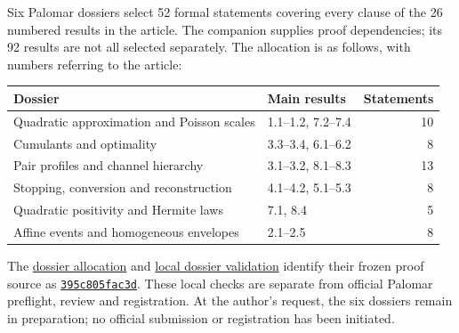 Six Palomar dossiers select 52 formal statements covering every clause
of the 26 numbered results in the article. The companion supplies proof
dependencies; its 92 results are not all selected separately.
The allocation is as follows, with numbers referring to the article:
\begin{center}
\small
\begin{tabularx}{\linewidth}{@{}Xlr@{}}
\toprule
Dossier & Main results & Statements\\
\midrule
Quadratic approximation and Poisson scales & 1.1--1.2, 7.2--7.4 & 10\\
Cumulants and optimality & 3.3--3.4, 6.1--6.2 & 8\\
Pair profiles and channel hierarchy & 3.1--3.2, 8.1--8.3 & 13\\
Stopping, conversion and reconstruction & 4.1--4.2, 5.1--5.3 & 8\\
Quadratic positivity and Hermite laws & 7.1, 8.4 & 5\\
Affine events and homogeneous envelopes & 2.1--2.5 & 8\\
\bottomrule
\end{tabularx}
\end{center}
The
\href{https://github.com/Vulkin-prog/paper-p1-lean/blob/a1c8092f7e25acf7f3b78283039cfbd69491f88e/palomar/REGISTRATION_PLAN_V2.json}{dossier allocation}
and
\href{https://github.com/Vulkin-prog/paper-p1-lean/blob/a1c8092f7e25acf7f3b78283039cfbd69491f88e/palomar/v3/VALIDATION.json}{local dossier validation}
identify their frozen proof source as
\href{https://github.com/Vulkin-prog/paper-p1-lean/tree/395c805fac3dbb2930de07cfa5286fef6d85c403}{\texttt{395c805fac3d}}.
These local checks are separate from official Palomar preflight, review and
registration. At the author's request, the six dossiers remain in preparation;
no official submission or registration has been initiated.
